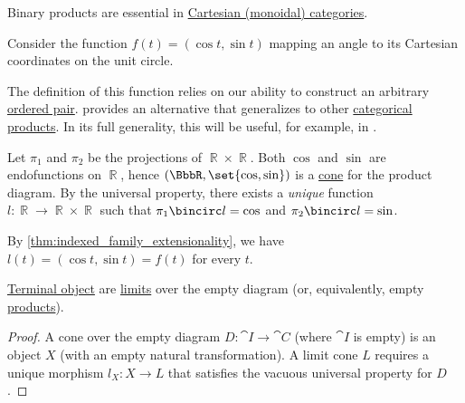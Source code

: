 \begin{comments}
  \item Binary products are essential in \hyperref[def:cartesian_monoidal_category]{Cartesian (monoidal) categories}.
\end{comments}

\begin{remark}\label{rem:definition_via_product_universal_property}
  Consider the function \( f(t) = (\cos t, \sin t) \) mapping an angle to its Cartesian coordinates on the unit circle.

  The definition of this function relies on our ability to construct an arbitrary \hyperref[def:ordered_tuple]{ordered pair}.  provides an alternative that generalizes to other \hyperref[def:categorical_product]{categorical products}. In its full generality, this will be useful, for example, in .

  Let \( \pi_1 \) and \( \pi_2 \) be the projections of \( \BbbR \times \BbbR \). Both \( \cos \) and \( \sin \) are endofunctions on \( \BbbR \), hence \( (\BbbR, \set{ \cos, \sin }) \) is a \hyperref[def:category_of_cones]{cone} for the product diagram. By the universal property, there exists a \emph{unique} function \( l: \BbbR \to \BbbR \times \BbbR \) such that \( \pi_1 \bincirc l = \cos \) and \( \pi_2 \bincirc l = \sin \).

  By \cref{thm:indexed_family_extensionality}, we have \( l(t) = (\cos t, \sin t) = f(t) \) for every \( t \).
\end{remark}

\begin{proposition}\label{thm:terminal_objects_as_limits}
  \hyperref[def:universal_objects/terminal]{Terminal object} are \hyperref[def:categorical_limit]{limits} over the empty diagram (or, equivalently, empty \hyperref[def:categorical_product]{products}).
\end{proposition}
\begin{proof}
  A cone over the empty diagram \( D: \cat{I} \to \cat{C} \) (where \( \cat{I} \) is empty) is an object \( X \) (with an empty natural transformation). A limit cone \( L \) requires a unique morphism \( l_X: X \to L \) that satisfies the vacuous universal property for \( D \).
\end{proof}


